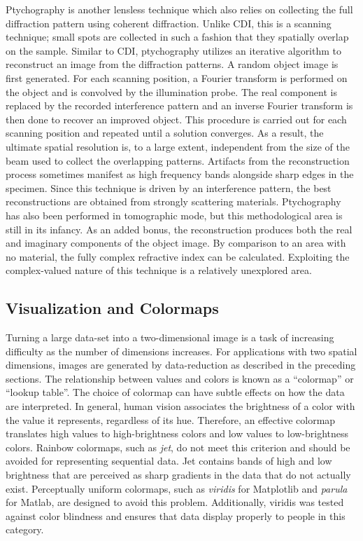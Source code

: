 \documentclass[journal=cmatex,manuscript=perspective]{achemso}
\begin{document}
Ptychography is another lensless technique which also relies on
collecting the full diffraction pattern using coherent
diffraction. Unlike CDI, this is a scanning technique; small spots are
collected in such a fashion that they spatially overlap on the
sample. Similar to CDI, ptychography utilizes an iterative algorithm
to reconstruct an image from the diffraction patterns. A random object
image is first generated. For each scanning position, a Fourier
transform is performed on the object and is convolved by the
illumination probe. The real component is replaced by the recorded
interference pattern and an inverse Fourier transform is then done to
recover an improved object. This procedure is carried out for each
scanning position and repeated until a solution converges. As a
result, the ultimate spatial resolution is, to a large extent,
independent from the size of the beam used to collect the overlapping
patterns. Artifacts from the reconstruction process sometimes manifest
as high frequency bands alongside sharp edges in the specimen. Since
this technique is driven by an interference pattern, the best
reconstructions are obtained from strongly scattering
materials. Ptychography has also been performed in tomographic
mode\cite{venkatakrishnan2016}, but this methodological area is still
in its infancy. As an added bonus, the reconstruction produces both
the real and imaginary components of the object image. By comparison
to an area with no material, the fully complex refractive index can be
calculated. Exploiting the complex-valued nature of this technique is
a relatively unexplored area.

\subsection{Visualization and Colormaps}

Turning a large data-set into a two-dimensional image is a task of
increasing difficulty as the number of dimensions increases. For
applications with two spatial dimensions, images are generated by
data-reduction as described in the preceding sections. The
relationship between values and colors is known as a ``colormap'' or
``lookup table''. The choice of colormap can have subtle effects on
how the data are interpreted. In general, human vision associates the
brightness of a color with the value it represents, regardless of its
hue. Therefore, an effective colormap translates high values to
high-brightness colors and low values to low-brightness
colors. Rainbow colormaps, such as \emph{jet}, do not meet this
criterion and should be avoided for representing sequential data. Jet
contains bands of high and low brightness that are perceived as sharp
gradients in the data that do not actually exist. Perceptually uniform
colormaps, such as \emph{viridis} for Matplotlib and \emph{parula} for
Matlab, are designed to avoid this problem. Additionally, viridis was
tested against color blindness and ensures that data display properly
to people in this category.
\end{document}
